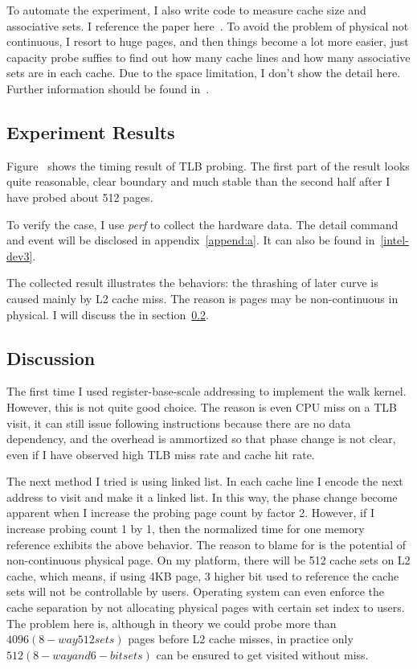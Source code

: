 To automate the experiment, I also write code to measure cache size and
associative sets. I reference the paper here~\cite{sigmetrics:cache}. To avoid
the problem of physical not continuous, I resort to huge pages, and then things
become a lot more easier, just capacity probe suffies to find out how many
cache lines and how many associative sets are in each cache. Due to the space limitation, I don't show the detail here. Further information should be found in~\cite{github}.

\subsection{Experiment Results}
%
%
%
%
Figure~\cite{fig:tlb-time} shows the timing result of TLB probing. The first
part of the result looks quite reasonable, clear boundary and much stable
than the second half after I have probed about 512 pages.

To verify the case, I use \emph{perf} to collect the hardware data. The detail
command and event will be disclosed in appendix~\ref{append:a}. It can also be
found in~\ref{intel-dev3}.

The collected result illustrates the behaviors: the thrashing of later curve
is caused mainly by L2 cache miss. The reason is pages may be non-continuous in
physical. I will discuss the in section~\ref{subsec:tlb-discus}.

\subsection{Discussion}
\label{subsec:tlb-discus}
The first time I used register-base-scale addressing to implement the walk
kernel. However, this is not quite good choice. The reason is even CPU miss
on a TLB visit, it can still issue following instructions because there are
no data dependency, and the overhead is ammortized so that phase change is
not clear, even if I have observed high TLB miss rate and cache hit rate.

The next method I tried is using linked list. In each cache line I encode the
next address to visit and make it a linked list. In this way, the phase change
become apparent when I increase the probing page count by factor 2. However, if
I increase probing count 1 by 1, then the normalized time for one memory
reference exhibits the above behavior. The reason to blame for is the potential
of non-continuous physical page. On my platform, there will be 512 cache sets
on L2 cache, which means, if using 4KB page, 3 higher bit used to reference
the cache sets will not be controllable by users. Operating system can even
enforce the cache separation by not allocating physical pages with certain
set index to users. The problem here is, although in theory we could probe
more than $4096 (8-way 512 sets)$ pages before L2 cache misses, in practice
only $512 (8-way and 6-bit sets)$ can be ensured to get visited without miss.

